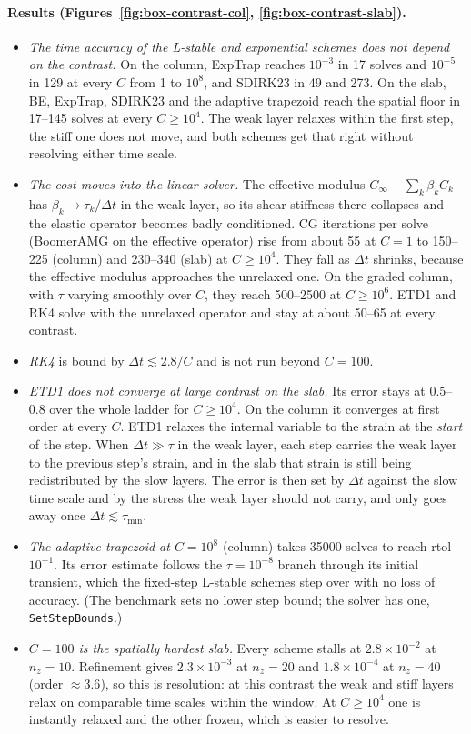 \documentclass[11pt]{article}
\numberwithin{equation}{section}
\newcommand{\code}[1]{\texttt{#1}}
\begin{document}
\paragraph{Results (Figures~\ref{fig:box-contrast-col}, \ref{fig:box-contrast-slab}).}
\begin{itemize}[leftmargin=*]
\item \emph{The time accuracy of the L-stable and exponential schemes does
  not depend on the contrast.} On the column, ExpTrap reaches $10^{-3}$
  in 17 solves and $10^{-5}$ in 129 at every $C$ from 1 to $10^8$, and
  SDIRK23 in 49 and 273. On the slab, BE, ExpTrap, SDIRK23 and the
  adaptive trapezoid reach the spatial floor in 17--145 solves at every
  $C\ge10^4$. The weak layer relaxes within the first step, the stiff one
  does not move, and both schemes get that right without resolving
  either time scale.
\item \emph{The cost moves into the linear solver.} The effective
  modulus $C_\infty+\sum_k\beta_kC_k$ has $\beta_k\to\tau_k/\Delta t$ in
  the weak layer, so its shear stiffness there collapses and the elastic
  operator becomes badly conditioned. CG iterations per solve (BoomerAMG
  on the effective operator) rise from about 55 at $C=1$ to 150--225
  (column) and 230--340 (slab) at $C\ge10^4$. They fall as $\Delta t$
  shrinks, because the effective modulus approaches the unrelaxed one. On
  the graded column, with $\tau$ varying smoothly over $C$, they reach
  500--2500 at $C\ge10^6$. ETD1 and RK4 solve with the unrelaxed operator
  and stay at about 50--65 at every contrast.
\item \emph{RK4} is bound by $\Delta t\lesssim2.8/C$ and is not run beyond
  $C=100$.
\item \emph{ETD1 does not converge at large contrast on the slab.} Its
  error stays at $0.5$--$0.8$ over the whole ladder for $C\ge10^4$. On the
  column it converges at first order at every $C$. ETD1 relaxes the
  internal variable to the strain at the \emph{start} of the step. When
  $\Delta t\gg\tau$ in the weak layer, each step carries the weak layer to
  the previous step's strain, and in the slab that strain is still being
  redistributed by the slow layers. The error is then set by $\Delta t$
  against the slow time scale and by the stress the weak layer should
  not carry, and only goes away once $\Delta t\lesssim\tau_{\min}$.
\item \emph{The adaptive trapezoid at $C=10^8$} (column) takes 35000
  solves to reach rtol $10^{-1}$. Its error estimate follows the
  $\tau=10^{-8}$ branch through its initial transient, which the
  fixed-step L-stable schemes step over with no loss of accuracy. (The
  benchmark sets no lower step bound; the solver has one,
  \code{SetStepBounds}.)
\item \emph{$C=100$ is the spatially hardest slab.} Every scheme stalls
  at $2.8\times10^{-2}$ at $n_z=10$. Refinement gives $2.3\times10^{-3}$
  at $n_z=20$ and $1.8\times10^{-4}$ at $n_z=40$ (order $\approx3.6$), so
  this is resolution: at this contrast the weak and stiff
  layers relax on comparable time scales within the window. At
  $C\ge10^4$ one is instantly relaxed and the other frozen, which is
  easier to resolve.
\end{itemize}
\end{document}
